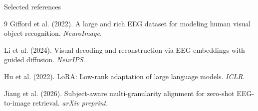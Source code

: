 \documentclass[aspectratio=169,11pt]{beamer}
\begin{document}
\appendix
\begin{frame}{Selected references}
  \vspace{0.10cm}
  {\fontsize{10.5}{13.5}\selectfont
  \begin{thebibliography}{9}
    Gifford et al. (2022).
    \newblock A large and rich EEG dataset for modeling human visual object recognition.
    \newblock \emph{NeuroImage}.

    Li et al. (2024).
    \newblock Visual decoding and reconstruction via EEG embeddings with guided diffusion.
    \newblock \emph{NeurIPS}.

    Hu et al. (2022).
    \newblock LoRA: Low-rank adaptation of large language models.
    \newblock \emph{ICLR}.

    Jiang et al. (2026).
    \newblock Subject-aware multi-granularity alignment for zero-shot EEG-to-image retrieval.
    \newblock \emph{arXiv preprint}.

  \end{thebibliography}
  }
\end{frame}
\end{document}
